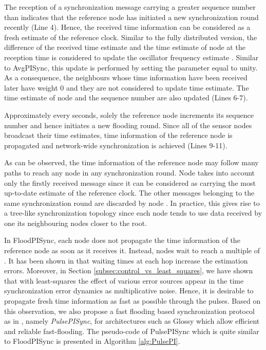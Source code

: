 \documentclass[english,a4paper,10pt,final]{article}
\numberwithin{equation}{section}
\numberwithin{figure}{section}
\begin{document}
The reception of a synchronization message carrying a greater sequence number than  indicates that the reference node has initiated a new synchronization round recently (Line 4). Hence, the received time information can be considered as a fresh estimate of the reference clock. Similar to the fully distributed version, the difference of the received time estimate  and the time estimate  of node  at the reception time is considered to update the oscillator frequency estimate . Similar to AvgPISync, this update is performed by setting the parameter  equal to unity. As a consequence, the neighbours whose time information have been received later have weight 0 and they are not considered to update time estimate. The time estimate  of node  and the sequence number are also updated (Lines 6-7). 

Approximately every  seconds, solely the reference node increments its sequence number and hence initiates a new flooding round. Since all of the sensor nodes broadcast their time estimates, time information of the reference node is propagated and network-wide synchronization is achieved (Lines 9-11). 

As can be observed, the  time information of the reference node may follow many paths to reach any node  in any synchronization round. Node  takes into account only the firstly received message since it can be considered as carrying the most up-to-date estimate of the reference clock. The other messages belonging to the same synchronization round are discarded by node . In practice, this gives rise to a tree-like synchronization topology since each node tends to use data received by one its neighbouring nodes closer to the root.

In FloodPISync, each node does not propagate the time information of the reference node as soon as it receives it. Instead, nodes wait  to reach a multiple of . It has been shown in \cite{Lenzen2009Optimal} that waiting times at each hop increase the estimation errors. Moreover, in Section \ref{subsec:control_vs_least_squares}, we have shown that with least-squares the effect of various error sources appear in the time synchronization error dynamics as multiplicative noise. Hence, it is desirable to propagate fresh time information as fast as possible through the pulses. Based on this observation, we also propose a fast flooding based synchronization protocol as in \cite{Lenzen2009Optimal}, namely \textit{PulsePISync}, for architectures such as Glossy \cite{ferrari2011efficient} which allow efficient and reliable fast-flooding. The pseudo-code of PulsePISync which is quite similar to FloodPISync is presented in Algorithm \ref{alg:PulsePI}.
\end{document}
